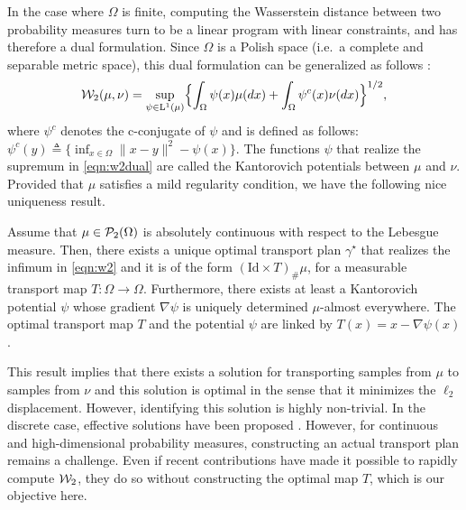 In the case where $\Omega$ is finite, computing the Wasserstein distance between two probability measures turn to be  a linear program with linear constraints, and has therefore a dual formulation. Since $\Omega$ is a Polish space (i.e.\ a complete and separable metric space), this dual formulation can be generalized as follows \cite[Theorem 5.10]{villani2008optimal}:
\begin{align}
{\cal W}_2(\mu,\nu) = \sup_{\psi \in \mathrm{L}^1(\mu)} \Bigl\{ \int_\Omega \psi(x) \mu(dx) + \int_\Omega \psi^c(x) \nu(dx) \Bigr\}^{1/2}, \label{eqn:w2dual}
\end{align}
where $\psi^c$ denotes the c-conjugate of $\psi$ and is defined as follows: $\psi^c(y) \triangleq \{ \inf_{x\in \Omega} \| x-y\|^2 - \psi(x)\}$. The functions $\psi$ that realize the supremum in \eqref{eqn:w2dual} are called the Kantorovich potentials between $\mu$ and $\nu$.
%
Provided that $\mu$ satisfies a mild regularity condition, we have the following nice uniqueness result.
\begin{thm}
\label{thm:unqmap}
Assume that  $\mu\in {\cal P}_2(\Omega)$ is absolutely continuous with respect to the Lebesgue measure. Then, there exists a unique optimal transport plan $\gamma^\star$ that realizes the infimum in \eqref{eqn:w2} and it is of the form $(\text{Id} \times T)_\# \mu$, for a measurable transport map $T : \Omega \to \Omega$. Furthermore, there exists at least a Kantorovich potential $\psi$ whose gradient $\nabla \psi$ is uniquely determined $\mu$-almost everywhere. The optimal transport map $T$ and the potential $\psi$ are linked by $T(x) = x- \nabla \psi(x)$.
\end{thm}


This result implies that there exists a solution for transporting samples from $\mu$ to samples from $\nu$ and this solution is optimal in the sense that it minimizes the $\ell_2$ displacement. However, identifying this solution is highly non-trivial. In the discrete case, effective solutions have been proposed \cite{cuturi2013sinkhorn}. However, for continuous and high-dimensional probability measures, constructing an actual transport plan remains a challenge. Even if recent contributions \cite{genevay2016stochastic} have made it possible to rapidly compute ${\cal W}_2$, they do so without constructing the optimal map $T$, which is our objective here.



